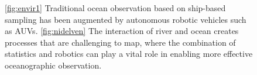 \documentclass[aoas,preprint]{imsart}
\begin{document}
\begin{figure}[!h] 
  \centering 
  \hfill
  \caption{\ref{fig:envir1} Traditional ocean observation based on 
    ship-based sampling has been augmented by autonomous
    robotic vehicles such as AUVs. 
    \ref{fig:nidelven} The interaction of river and ocean creates
    processes that are challenging to map, where the combination of
    statistics and robotics can play a vital role in enabling more
    effective oceanographic observation.}
  \label{fig:envir} \end{figure}
\end{document}
